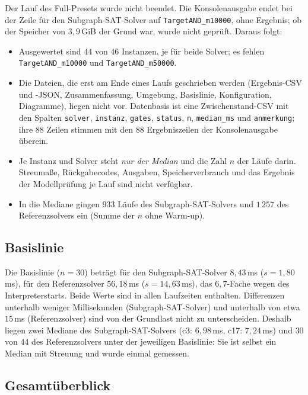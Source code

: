 Der Lauf des Full-Presets wurde nicht beendet. Die Konsolenausgabe endet bei der Zeile für den Subgraph-SAT-Solver auf \texttt{TargetAND\_m10000}, ohne Ergebnis; ob der Speicher von $3{,}9$\,GiB der Grund war, wurde nicht geprüft. Daraus folgt:

\begin{itemize}
	\item Ausgewertet sind $44$ von $46$ Instanzen, je für beide Solver; es fehlen \texttt{TargetAND\_m10000} und \texttt{TargetAND\_m50000}.
	\item Die Dateien, die erst am Ende eines Laufs geschrieben werden (Ergebnis-CSV und -JSON, Zusammenfassung, Umgebung, Basislinie, Konfiguration, Diagramme), liegen nicht vor. Datenbasis ist eine Zwischenstand-CSV mit den Spalten \texttt{solver}, \texttt{instanz}, \texttt{gates}, \texttt{status}, \texttt{n}, \texttt{median\_ms} und \texttt{anmerkung}; ihre $88$ Zeilen stimmen mit den $88$ Ergebniszeilen der Konsolenausgabe überein.
	\item Je Instanz und Solver steht \emph{nur der Median} und die Zahl $n$ der Läufe darin. Streumaße, Rückgabecodes, Ausgaben, Speicherverbrauch und das Ergebnis der Modellprüfung je Lauf sind nicht verfügbar.
	\item In die Mediane gingen $933$ Läufe des Subgraph-SAT-Solvers und $1\,257$ des Referenzsolvers ein (Summe der $n$ ohne Warm-up).
\end{itemize}

\subsection{Basislinie}

Die Basislinie ($n=30$) beträgt für den Subgraph-SAT-Solver $8{,}43$\,ms ($s=1{,}80$\,ms), für den Referenzsolver $56{,}18$\,ms ($s=14{,}63$\,ms), das $6{,}7$-Fache wegen des Interpreterstarts. Beide Werte sind in allen Laufzeiten enthalten. Differenzen unterhalb weniger Millisekunden (Subgraph-SAT-Solver) und unterhalb von etwa $15$\,ms (Referenzsolver) sind von der Grundlast nicht zu unterscheiden. Deshalb liegen zwei Mediane des Subgraph-SAT-Solvers (c3: $6{,}98$\,ms, c17: $7{,}24$\,ms) und $30$ von $44$ des Referenzsolvers unter der jeweiligen Basislinie: Sie ist selbst ein Median mit Streuung und wurde einmal gemessen.

\subsection{Gesamtüberblick}

